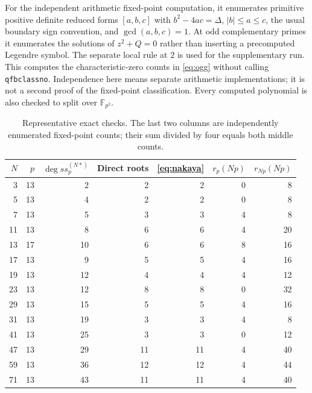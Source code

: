 \documentclass[11pt,a4paper]{article}
\theoremstyle{remark}\newtheorem{remark}[theorem]{Remark}
\numberwithin{equation}{section}
\begin{document}
For the independent arithmetic fixed-point computation, it enumerates primitive positive definite reduced forms $[a,b,c]$ with $b^2-4ac=\Delta$, $|b|\leq a\leq c$, the usual boundary sign convention, and $\gcd(a,b,c)=1$. At odd complementary primes it enumerates the solutions of $z^2+Q=0$ rather than inserting a precomputed Legendre symbol. The separate local rule at $2$ is used for the supplementary run. This computes the characteristic-zero counts in \eqref{eq:ogg} without calling \texttt{qfbclassno}. Independence here means separate arithmetic implementations; it is not a second proof of the fixed-point classification. Every computed polynomial is also checked to split over $\mathbb F_{p^2}$.

\begin{table}[ht]
\centering
\caption{Representative exact checks. The last two columns are independently enumerated fixed-point counts; their sum divided by four equals both middle counts.}
\label{tab:checks}
\begin{tabular}{rrrrrrr}\toprule
$N$&$p$&$\deg ss_p^{(N*)}$&Direct roots&\eqref{eq:nakaya}&$r_p(Np)$&$r_{Np}(Np)$\\\midrule
3 & 13 & 2 & 2 & 2 & 0 & 8 \\
5 & 13 & 4 & 2 & 2 & 0 & 8 \\
7 & 13 & 5 & 3 & 3 & 4 & 8 \\
11 & 13 & 8 & 6 & 6 & 4 & 20 \\
13 & 17 & 10 & 6 & 6 & 8 & 16 \\
17 & 13 & 9 & 5 & 5 & 4 & 16 \\
19 & 13 & 12 & 4 & 4 & 4 & 12 \\
23 & 13 & 12 & 8 & 8 & 0 & 32 \\
29 & 13 & 15 & 5 & 5 & 4 & 16 \\
31 & 13 & 19 & 3 & 3 & 4 & 8 \\
41 & 13 & 25 & 3 & 3 & 0 & 12 \\
47 & 13 & 29 & 11 & 11 & 4 & 40 \\
59 & 13 & 36 & 12 & 12 & 4 & 44 \\
71 & 13 & 43 & 11 & 11 & 4 & 40 \\
\bottomrule\end{tabular}
\end{table}
\end{document}
